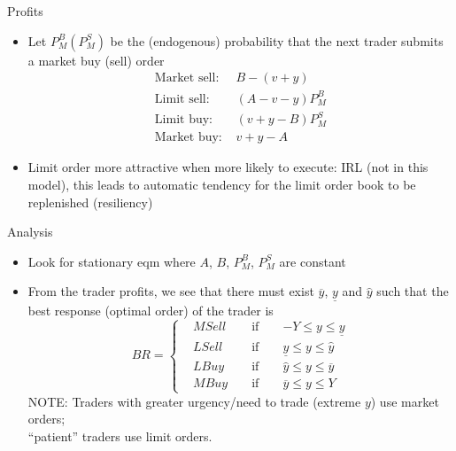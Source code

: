 \documentclass[english,10pt
,aspectratio=169
]{beamer}
\begin{document}
\begin{frame}{Profits}
	\begin{itemize}
		\item Let $P^B_M (P^S_M)$ be the (endogenous) probability that the next trader submits a market buy (sell) order 
		\begin{align*}
			\text{Market sell: } & B-(v+y) \\
			\text{Limit sell: } & (A-v-y)P^B_M \\
			\text{Limit buy: } &(v+y-B)P^S_M \\
			\text{Market buy: } &v+y-A
		\end{align*}
		\item Limit order more attractive when more likely to execute: IRL (not in this model), this leads to automatic tendency for the limit order book to be replenished (resiliency)
	\end{itemize}
\end{frame}


\begin{frame}{Analysis}
	\begin{itemize}
		\item Look for stationary eqm where  $A$, $B$, $P^B_M$, $P^S_M$ are constant 
		\item From the trader profits, we see that there must exist $\overline{y}$,  $\underline{y}$ and $\hat{y}$ such that the best response (optimal order) of the trader is
		\begin{equation*}
		BR=\left\{ \begin{aligned}
		&MSell		&& 	\text{ if } 	&&	-Y\le y \le \underline{y} \\
		&LSell 		&&	\text{ if } 	&&	\underline{y} \le y \le \hat{y} \\
		&LBuy		&&	\text{ if } 	&&	\hat{y} \le y \le \overline{y} \\
		&MBuy	&&	\text{ if } 	&&	\overline{y} \le y \le Y
		\end{aligned}
		\right.
		\end{equation*}
		NOTE: Traders with greater urgency/need to trade (extreme $y$) use market orders; 
		\\
		``patient'' traders use limit orders.
	\end{itemize}
\end{frame}
\end{document}

